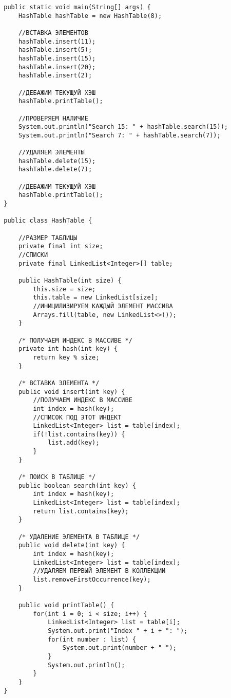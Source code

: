 \documentclass[12pt,a4paper]{scrartcl}
\begin{document}
	\begin{verbatim}
		public static void main(String[] args) {
			HashTable hashTable = new HashTable(8);
			
			//ВСТАВКА ЭЛЕМЕНТОВ
			hashTable.insert(11);
			hashTable.insert(5);
			hashTable.insert(15);
			hashTable.insert(20);
			hashTable.insert(2);
			
			//ДЕБАЖИМ ТЕКУЩУЙ ХЭШ
			hashTable.printTable();
			
			//ПРОВЕРЯЕМ НАЛИЧИЕ
			System.out.println("Search 15: " + hashTable.search(15));
			System.out.println("Search 7: " + hashTable.search(7));
			
			//УДАЛЯЕМ ЭЛЕМЕНТЫ
			hashTable.delete(15);
			hashTable.delete(7);
			
			//ДЕБАЖИМ ТЕКУЩУЙ ХЭШ
			hashTable.printTable();
		}
		
		public class HashTable {
			
			//РАЗМЕР ТАБЛИЦЫ
			private final int size;
			//СПИСКИ
			private final LinkedList<Integer>[] table;
			
			public HashTable(int size) {
				this.size = size;
				this.table = new LinkedList[size];
				//ИНИЦИЛИЗИРУЕМ КАЖДЫЙ ЭЛЕМЕНТ МАССИВА
				Arrays.fill(table, new LinkedList<>());
			}
			
			/* ПОЛУЧАЕМ ИНДЕКС В МАССИВЕ */
			private int hash(int key) {
				return key % size;
			}
			
			/* ВСТАВКА ЭЛЕМЕНТА */
			public void insert(int key) {
				//ПОЛУЧАЕМ ИНДЕКС В МАССИВЕ
				int index = hash(key);
				//СПИСОК ПОД ЭТОТ ИНДЕКТ
				LinkedList<Integer> list = table[index];
				if(!list.contains(key)) {
					list.add(key);
				}
			}
			
			/* ПОИСК В ТАБЛИЦЕ */
			public boolean search(int key) {
				int index = hash(key);
				LinkedList<Integer> list = table[index];
				return list.contains(key);
			}
			
			/* УДАЛЕНИЕ ЭЛЕМЕНТА В ТАБЛИЦЕ */
			public void delete(int key) {
				int index = hash(key);
				LinkedList<Integer> list = table[index];
				//УДАЛЯЕМ ПЕРВЫЙ ЭЛЕМЕНТ В КОЛЛЕКЦИИ
				list.removeFirstOccurrence(key);
			}
			
			public void printTable() {
				for(int i = 0; i < size; i++) {
					LinkedList<Integer> list = table[i];
					System.out.print("Index " + i + ": ");
					for(int number : list) {
						System.out.print(number + " ");
					}
					System.out.println();
				}
			}
		}
		
	\end{verbatim}
\end{document}
